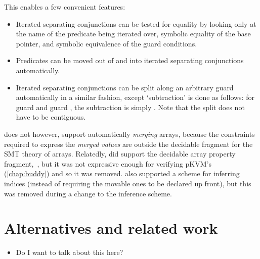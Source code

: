 This enables a few convenient features:
\begin{itemize}
    \item Iterated separating conjunctions can be tested for equality by
        looking only at the name of the predicate being iterated over, symbolic
        equality of the base pointer, and symbolic equivalence of the guard
        conditions.
    \item Predicates can be moved out of and into iterated separating conjunctions
        automatically.
    \item Iterated separating conjunctions can be split along an arbitrary
        guard automatically in a similar fashion, except `subtraction' is done as follows:
        for guard  and guard
        , %
        the subtraction is simply . Note that the split %
        does not have to be contiguous.
\end{itemize}

 does not however, support automatically \emph{merging} arrays, because
the constraints required to express the \emph{merged values} are outside the
decidable fragment for the SMT theory of arrays. Relatedly,  did
support the decidable array property fragment,~, but
it was not expressive enough for verifying pKVM's 
(\cref{chap:buddy}) and so it was removed.  also supported a scheme for
inferring indices (instead of requiring the movable ones to be declared up
front), but this was removed during a change to the inference
scheme.\label{sn:new-inf}

\section{Alternatives and related work}

\begin{itemize}
    \item Do I want to talk about this here?
\end{itemize}

